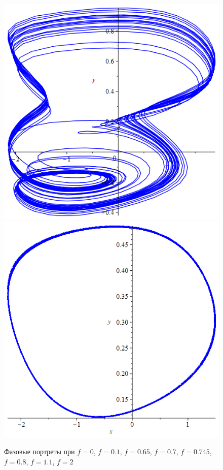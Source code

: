 \documentclass[10pt,a4paper]{article}
\begin{document}
\begin{figure}[h]
		{\includegraphics[scale=0.2]{Lab3 f=1.1}}
		{\includegraphics[scale=0.2]{Lab3 f=2}}
		\caption{Фазовые портреты при $f = 0$, $f = 0.1$, $f = 0.65$, $f = 0.7$, $f = 0.745$, $f = 0.8$, $f = 1.1$, $f = 2$}
		\label{image/1}
	\end{figure}
\end{document}
